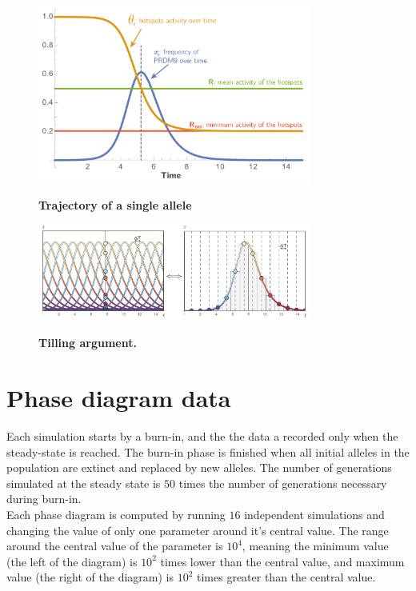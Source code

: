 \documentclass{article}
\begin{document}
\begin{figure}[!ht]
	  \centering
       \includegraphics[width=0.8\textwidth]{Images/single-allele.pdf}\\
		\caption{ \textbf{ Trajectory of a single allele} 
}
\end{figure}

\begin{figure}[!ht]
	  \centering
       \includegraphics[width=0.8\textwidth]{Images/tilling-argument.pdf}\\
		\caption{ \textbf{ Tilling argument.} 
}
\end{figure}

\clearpage

\part*{Phase diagram data}
Each simulation starts by a burn-in, and the the data a recorded only when the steady-state is reached. The burn-in phase is finished when all initial alleles in the population are extinct and replaced by new alleles. The number of generations simulated at the steady state is $50$ times the number of generations necessary during burn-in. \\

Each phase diagram is computed by running $16$ independent simulations and changing the value of only one parameter around it's central value. The range around the central value of the parameter is $10^{4}$, meaning the minimum value (the left of the diagram) is $10^2$ times lower than the central value, and maximum value (the right of the diagram) is $10^2$ times greater than the central value.\\
\end{document}
